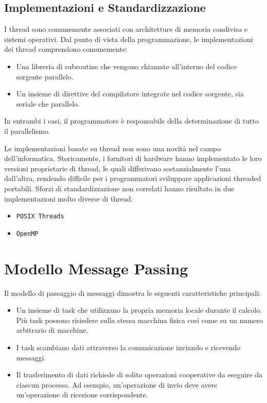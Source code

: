 \subsection{Implementazioni e Standardizzazione}
I thread sono comunemente associati con architetture
di memoria condivisa e sistemi operativi. Dal punto di
vista della programmazione, le implementazioni dei thread
comprendono comunemente:
\begin{itemize}
    \item Una libreria di subroutine che vengono chiamate
    all'interno del codice sorgente parallelo.
    \item Un insieme di direttive del compilatore
    integrate nel codice sorgente, sia seriale che
    parallelo.
\end{itemize}
In entrambi i casi, il programmatore è responsabile della
determinazione di tutto il parallelismo.

Le implementazioni basate su thread non sono una novità
nel campo dell'informatica. Storicamente, i fornitori
di hardware hanno implementato le loro versioni
proprietarie di thread, le quali differivano
sostanzialmente l'una dall'altra, rendendo difficile
per i programmatori sviluppare applicazioni threaded
portabili. Sforzi di standardizzazione non correlati
hanno risultato in due implementazioni molto diverse di
thread:
\begin{itemize}
    \item \texttt{POSIX Threads}
    \item \texttt{OpenMP}
\end{itemize}

\section{Modello Message Passing}
Il modello di passaggio di messaggi dimostra le seguenti
caratteristiche principali:

\begin{itemize}
    \item Un insieme di task che utilizzano la propria
    memoria locale durante il calcolo. Più task possono
    risiedere sulla stessa macchina fisica così come su
    un numero arbitrario di macchine.
    \item I task scambiano dati attraverso la
    comunicazione inviando e ricevendo messaggi.
    \item Il trasferimento di dati richiede di solito
    operazioni cooperative da eseguire da ciascun processo.
    Ad esempio, un'operazione di invio deve avere
    un'operazione di ricezione corrispondente.
\end{itemize}

